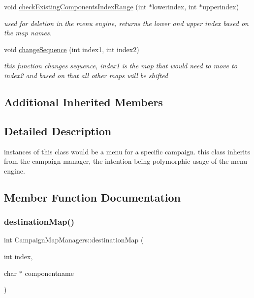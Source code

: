 \begin{DoxyCompactItemize}
\hypertarget{class_campaign_map_managers_a16313d7f353d1925c3341201b9600846}{}\label{class_campaign_map_managers_a16313d7f353d1925c3341201b9600846} 
void \hyperlink{class_campaign_map_managers_a16313d7f353d1925c3341201b9600846}{check\+Existing\+Components\+Index\+Range} (int $\ast$lowerindex, int $\ast$upperindex)
\begin{DoxyCompactList}\small\item\em used for deletion in the menu engine, returns the lower and upper index based on the map names. \end{DoxyCompactList}\item 
\hypertarget{class_campaign_map_managers_a5935b7ed9d63ff44d748f7860c3eceb1}{}\label{class_campaign_map_managers_a5935b7ed9d63ff44d748f7860c3eceb1} 
void \hyperlink{class_campaign_map_managers_a5935b7ed9d63ff44d748f7860c3eceb1}{change\+Sequence} (int index1, int index2)
\begin{DoxyCompactList}\small\item\em this function changes sequence, index1 is the map that would need to move to index2 and based on that all other maps will be shifted \end{DoxyCompactList}\end{DoxyCompactItemize}
\subsection*{Additional Inherited Members}


\subsection{Detailed Description}
instances of this class would be a menu for a specific campaign. this class inherits from the campaign manager, the intention being polymorphic usage of the menu engine. 

\subsection{Member Function Documentation}
\hypertarget{class_campaign_map_managers_a7136317d7a94280b0a0b2a3f69b18182}{}\label{class_campaign_map_managers_a7136317d7a94280b0a0b2a3f69b18182} 
\subsubsection{\texorpdfstring{destination\+Map()}{destinationMap()}}
{\footnotesize\ttfamily int Campaign\+Map\+Managers\+::destination\+Map (\begin{DoxyParamCaption}\item[{int}]{index,  }\item[{char $\ast$}]{componentname }\end{DoxyParamCaption})\hspace{0.3cm}{\ttfamily [virtual]}}


